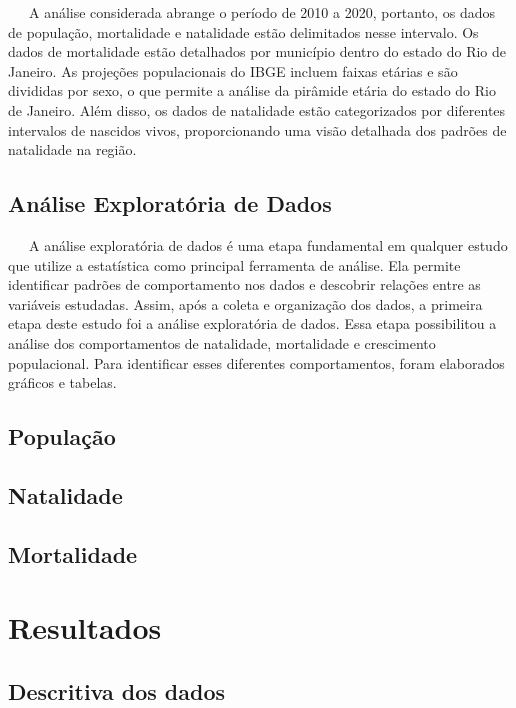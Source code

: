 \documentclass[
  12pt,
  letterpaper,
  DIV=11,
  numbers=noendperiod]{scrreprt}
\begin{document}
\vspace{12pt}

~~~A análise considerada abrange o período de 2010 a 2020, portanto, os
dados de população, mortalidade e natalidade estão delimitados nesse
intervalo. Os dados de mortalidade estão detalhados por município dentro
do estado do Rio de Janeiro. As projeções populacionais do IBGE incluem
faixas etárias e são divididas por sexo, o que permite a análise da
pirâmide etária do estado do Rio de Janeiro. Além disso, os dados de
natalidade estão categorizados por diferentes intervalos de nascidos
vivos, proporcionando uma visão detalhada dos padrões de natalidade na
região.

\section{Análise Exploratória de
Dados}\label{anuxe1lise-exploratuxf3ria-de-dados}

~~~A análise exploratória de dados é uma etapa fundamental em qualquer
estudo que utilize a estatística como principal ferramenta de análise.
Ela permite identificar padrões de comportamento nos dados e descobrir
relações entre as variáveis estudadas. Assim, após a coleta e
organização dos dados, a primeira etapa deste estudo foi a análise
exploratória de dados. Essa etapa possibilitou a análise dos
comportamentos de natalidade, mortalidade e crescimento populacional.
Para identificar esses diferentes comportamentos, foram elaborados
gráficos e tabelas.

\section{População}\label{populauxe7uxe3o}

\section{Natalidade}\label{natalidade}

\section{Mortalidade}\label{mortalidade}

\chapter{Resultados}\label{resultados}

\section{Descritiva dos dados}\label{descritiva-dos-dados}
\end{document}
